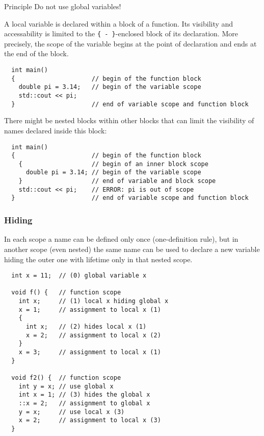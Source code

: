 \begin{guideline}{Principle}
  Do not use global variables!
\end{guideline}

A local variable is declared within a block of a function. Its visibility and accessability is limited to the \texttt{\{ - \}}-enclosed block
of its declaration. More precisely, the scope of the variable begins at the point of declaration and ends at the end of the block.
\begin{verbatim}
  int main()
  {                     // begin of the function block
    double pi = 3.14;   // begin of the variable scope
    std::cout << pi;
  }                     // end of variable scope and function block
\end{verbatim}

There might be nested blocks within other blocks that can limit the visibility of names declared inside this block:
\begin{verbatim}
  int main()
  {                     // begin of the function block
    {                   // begin of an inner block scope
      double pi = 3.14; // begin of the variable scope
    }                   // end of variable and block scope
    std::cout << pi;    // ERROR: pi is out of scope
  }                     // end of variable scope and function block
\end{verbatim}

\subsubsection{Hiding}
In each scope a name can be defined only once (one-definition rule), but in another scope (even nested) the same name can be
used to declare a new variable hiding the outer one with lifetime only in that nested scope.

\begin{verbatim}
  int x = 11;  // (0) global variable x

  void f() {   // function scope
    int x;     // (1) local x hiding global x
    x = 1;     // assignment to local x (1)
    {
      int x;   // (2) hides local x (1)
      x = 2;   // assignment to local x (2)
    }
    x = 3;     // assignment to local x (1)
  }

  void f2() {  // function scope
    int y = x; // use global x
    int x = 1; // (3) hides the global x
    ::x = 2;   // assignment to global x
    y = x;     // use local x (3)
    x = 2;     // assignment to local x (3)
  }
\end{verbatim}


